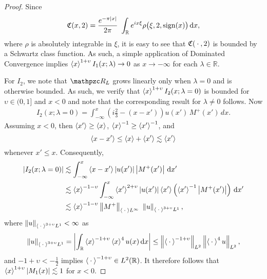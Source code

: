 \documentclass[../dissertation.tex]{subfiles}
\begin{document}
\begin{proof}
	Since 
	\[
		\mathfrak C(x, 2)
			= \frac{e^{-\pi|x|}}{2\pi}	\
				\int_{\mathbb R} e^{ix\xi} \rho\big(\xi, 2, \operatorname{sign}(x)\big) \, \mathrm{d}x,
	\]
	where $\rho$ is absolutely integrable in $\xi$, it is easy to see that 
	$\mathfrak C(\kern 0.5ex \cdot \kern 0.5ex, 2)$ is bounded by a Schwartz class function. As such, 
	a simple application of Dominated Convergence implies 
	$\left\langle x \right\rangle^{1+\upsilon} I_1(x; \lambda) \to 0$ as $x\to -\infty$ for each 
	$\lambda \in \mathbb R$. 

	For $I_2$, we note that $\mathpzc R_L$ grows linearly only when $\lambda=0$
	and is otherwise bounded. As such, we verify that 
	$\left\langle x \right\rangle^{1+\upsilon} I_2(x; \lambda =0)$ is bounded for $\upsilon \in (0,1]$
	and $x < 0$ and note that the corresponding result for $\lambda \ne 0$ follows.
	Now
	\begin{align*}
		I_2(x; \lambda=0) 
			= 
				\int_{-\infty}^x 
					\left(i\frac{2}{3} - (x - x')\right) u(x')\,M^+(x')
				\,dx.
	\end{align*}
	Assuming $x < 0$, then $\left\langle x' \right\rangle \geq \left\langle x \right\rangle$, $\left\langle x \right\rangle^{-1} \geq \left\langle x' \right\rangle^{-1}$, and
	\[
		\left\langle x-x' \right\rangle \leq \left\langle x \right\rangle + \left\langle x' \right\rangle \lesssim \left\langle x' \right\rangle
	\]
	whenever $x' \leq x$.
	Consequently,
	\begin{align*}
		|I_2(x; \lambda = 0)|
			&\lesssim \int_{-\infty}^x \left\langle x - x' \right\rangle |u(x')| \left|M^+(x')\right| \, \mathrm{d}x' 
				\\
			&\lesssim 
				\left\langle x \right\rangle^{-1-\upsilon} 
				\int_{-\infty}^x 
					\left\langle x' \right\rangle^{2+\upsilon} |u(x')| \left\langle x' \right\rangle 
					\left(\left\langle x' \right\rangle^{-1} \left|M^+(x')\right| \right)
				\, \mathrm{d}x'
				\\
			&\lesssim 
				\left\langle x \right\rangle^{-1-\upsilon} 
				\left\| M^+ \right\|_{\left\langle \kern 0.5ex \cdot \kern 0.5ex \right\rangle L^\infty} \
				\left\| u \right\|_{\left\langle \kern 0.5ex \cdot \kern 0.5ex \right\rangle^{3+\upsilon}L^1},
	\end{align*}
	where $\left\| u \right\|_{\left\langle \kern 0.5ex \cdot \kern 0.5ex \right\rangle^{3+\upsilon}L^1}<\infty$ as 
	\begin{align*}
		\left\| u \right\|_{\left\langle \kern 0.5ex \cdot \kern 0.5ex \right\rangle^{3+\upsilon}L^1}
			= 
				\left| 
					\int_{\mathbb R} 
						\left\langle x \right\rangle^{-1+\upsilon}\left\langle x \right\rangle^{4} u(x) 
					\, \mathrm{d}x
				\right|
			\leq 
				\left\| \left\langle \kern 0.5ex \cdot \kern 0.5ex \right\rangle^{-1+\upsilon} \right\|_{L^2} 
				\left\| \left\langle \kern 0.5ex \cdot \kern 0.5ex \right\rangle^{4} u \right\|_{L^2},
	\end{align*}
	and $-1+\upsilon < -\frac{1}{2}$ implies 
	$\left\langle \kern 0.5ex \cdot \kern 0.5ex \right\rangle^{-1+\upsilon} \in L^2(\mathbb R)$. It therefore follows that 
	$\left\langle x \right\rangle^{1+\upsilon} |M_1(x)| \lesssim 1$ for $x < 0$. 
\end{proof}
\end{document}
